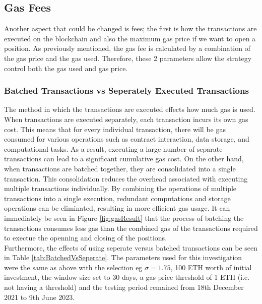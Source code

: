 \subsection{Gas Fees}
Another aspect that could be changed is fees; the first is how the transactions are executed on the blockchain and also the maximum gas price if we want to open a position. As previously mentioned, the gas fee is calculated by a combination of the gas price and the gas used. Therefore, these 2 parameters allow the strategy control both the gas used and gas price.

\subsubsection{Batched Transactions vs Seperately Executed Transactions}
The method in which the transactions are executed effects how much gas is used. When transactions are executed separately, each transaction incurs its own gas cost. This means that for every individual transaction, there will be gas consumed for various operations such as contract interaction, data storage, and computational tasks. As a result, executing a large number of separate transactions can lead to a significant cumulative gas cost. On the other hand, when transactions are batched together, they are consolidated into a single transaction. This consolidation reduces the overhead associated with executing multiple transactions individually. By combining the operations of multiple transactions into a single execution, redundant computations and storage operations can be eliminated, resulting in more efficient gas usage. It can immediately be seen in Figure \ref{fig:gasResult} that the process of batching the transactions consumes less gas than the combined gas of the transactions required to exectue the openning and closing of the positions.
\\[5mm]
Furthermore, the effects of using seperate versus batched transactions can be seen in Table \ref{tab:BatchedVsSeperate}. The parameters used for this investigation were the same as above with the selection eg $\sigma = 1.75$, 100 ETH worth of initial investment, the window size set to 30 days, a gas price threshold of 1 ETH (i.e. not having a threshold) and the testing period remained from 18th December 2021 to 9th June 2023.

